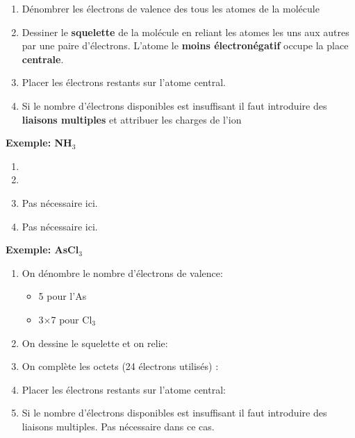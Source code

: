 \documentclass[10pt,a4paper]{book}
\begin{document}
\begin{enumerate}
\item Dénombrer les électrons de valence des tous les atomes de la molécule
\item Dessiner le \textbf{squelette} de la molécule en reliant les atomes les uns aux autres par une paire d'électrons. L'atome le \textbf{moins électronégatif} occupe la place \textbf{centrale}.
\item Placer les électrons restants sur l'atome central.
\item Si le nombre d'électrons disponibles est insuffisant il faut introduire des \textbf{liaisons multiples} et attribuer les charges de l'ion
\end{enumerate}
\textbf{Exemple: NH$_3$}
\begin{center}
\begin{enumerate}
\item {}
\item {}
\item Pas nécessaire ici.
\item Pas nécessaire ici.
\end{enumerate}
\end{center}
\textbf{Exemple: AsCl$_3$}
\begin{enumerate}
\item On dénombre le nombre d'électrons de valence:
\begin{itemize}
	\item 5 pour l'As
	\item 3$\times$7 pour Cl$_3$
\end{itemize}
\item On dessine le squelette et on relie: 
\item On complète les octets (24 électrons utilisés) : 
\item Placer les électrons restants sur l’atome central: 
\item Si le nombre d’électrons disponibles est insuffisant il faut introduire des liaisons multiples. Pas nécessaire dans ce cas.
\end{enumerate}
\end{document}
